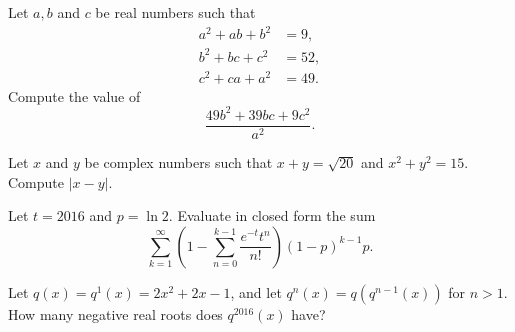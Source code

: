 \documentclass[11pt]{article}
\theoremstyle{definition}
\begin{document}
%	





\begin{question}[name={2016 HMMT, Algebra, \href{https://artofproblemsolving.com/community/c129h1359321p7444574}{Problem 10}}]
	Let $a,b$ and $c$ be real numbers such that
	\begin{align*}
		a^2+ab+b^2&=9, \\
		b^2+bc+c^2&=52, \\
		c^2+ca+a^2&=49.
	\end{align*}Compute the value of $$\dfrac{49b^2+39bc+9c^2}{a^2}.$$
\end{question}


%	





\begin{question}[name={2016 HMMT, Guts, \href{https://artofproblemsolving.com/community/c129h1359322p7444579}{Problem 1}}]
	Let $x$ and $y$ be complex numbers such that $x+y=\sqrt{20}$ and $x^2+y^2=15$. Compute $|x-y|$.	
\end{question}




%	








\begin{question}[name={2016 HMMT, Guts, \href{https://artofproblemsolving.com/community/c129h1359347p7444627}{Problem 23}}]
	Let $t = 2016$ and $p = \ln 2$. Evaluate in closed form the sum
	\[ \sum_{k=1}^{\infty} 
	\left(
	1-\sum_{n=0}^{k-1}\frac{e^{-t}t^{n}}{n!}
	\right)
	\left(1-p\right)^{k-1}p. \]
\end{question}




%	





\begin{question}[name={2016 HMMT, Team, \href{https://artofproblemsolving.com/community/c129h1361533p7462731}{Problem 7}}]
	Let $q(x) = q^1(x) = 2x^2 + 2x - 1$, and let $q^n(x) = q(q^{n-1}(x))$ for $n > 1$.
	How many negative real roots does $q^{2016}(x)$ have?
\end{question}
\end{document}
